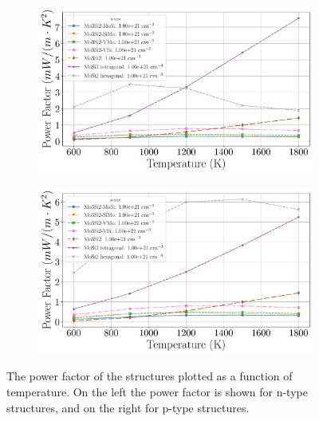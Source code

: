 \documentclass[12pt]{article}
\theoremstyle{plain}
\theoremstyle{definition}
\newcommand{\<}{\langle}
\renewcommand{\>}{\rangle}
\begin{document}
\begin{figure}[b!]
\centering
\begin{subfigure}{.5\textwidth}
  \centering
  \includegraphics[width=\linewidth]{allmats_Po_temp_doping_n}
  \caption{}
  \label{fig:sub1}
\end{subfigure}%
\begin{subfigure}{.5\textwidth}
  \centering
  \includegraphics[width=\linewidth]{allmats_Po_temp_doping_p}
  \caption{}
  \label{fig:sub2}
\end{subfigure}
\caption{The power factor of the structures plotted as a function of temperature. On the left the power factor is shown for n-type structures, and on the right for p-type structures.}
\label{fig:Po-T}
\end{figure}
\end{document}
